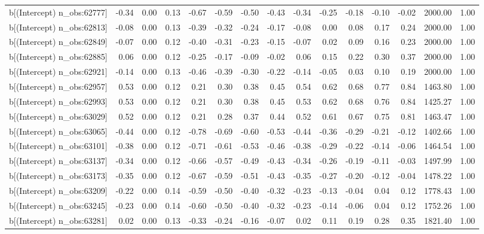 \begin{table}[ht]
\begin{tabular}{rrrrrrrrrrrrrrr}
  b[(Intercept) n\_obs:62777] & -0.34 & 0.00 & 0.13 & -0.67 & -0.59 & -0.50 & -0.43 & -0.34 & -0.25 & -0.18 & -0.10 & -0.02 & 2000.00 & 1.00 \\ 
  b[(Intercept) n\_obs:62813] & -0.08 & 0.00 & 0.13 & -0.39 & -0.32 & -0.24 & -0.17 & -0.08 & 0.00 & 0.08 & 0.17 & 0.24 & 2000.00 & 1.00 \\ 
  b[(Intercept) n\_obs:62849] & -0.07 & 0.00 & 0.12 & -0.40 & -0.31 & -0.23 & -0.15 & -0.07 & 0.02 & 0.09 & 0.16 & 0.23 & 2000.00 & 1.00 \\ 
  b[(Intercept) n\_obs:62885] & 0.06 & 0.00 & 0.12 & -0.25 & -0.17 & -0.09 & -0.02 & 0.06 & 0.15 & 0.22 & 0.30 & 0.37 & 2000.00 & 1.00 \\ 
  b[(Intercept) n\_obs:62921] & -0.14 & 0.00 & 0.13 & -0.46 & -0.39 & -0.30 & -0.22 & -0.14 & -0.05 & 0.03 & 0.10 & 0.19 & 2000.00 & 1.00 \\ 
  b[(Intercept) n\_obs:62957] & 0.53 & 0.00 & 0.12 & 0.21 & 0.30 & 0.38 & 0.45 & 0.54 & 0.62 & 0.68 & 0.77 & 0.84 & 1463.80 & 1.00 \\ 
  b[(Intercept) n\_obs:62993] & 0.53 & 0.00 & 0.12 & 0.21 & 0.30 & 0.38 & 0.45 & 0.53 & 0.62 & 0.68 & 0.76 & 0.84 & 1425.27 & 1.00 \\ 
  b[(Intercept) n\_obs:63029] & 0.52 & 0.00 & 0.12 & 0.21 & 0.28 & 0.37 & 0.44 & 0.52 & 0.61 & 0.67 & 0.75 & 0.81 & 1463.47 & 1.00 \\ 
  b[(Intercept) n\_obs:63065] & -0.44 & 0.00 & 0.12 & -0.78 & -0.69 & -0.60 & -0.53 & -0.44 & -0.36 & -0.29 & -0.21 & -0.12 & 1402.66 & 1.00 \\ 
  b[(Intercept) n\_obs:63101] & -0.38 & 0.00 & 0.12 & -0.71 & -0.61 & -0.53 & -0.46 & -0.38 & -0.29 & -0.22 & -0.14 & -0.06 & 1464.54 & 1.00 \\ 
  b[(Intercept) n\_obs:63137] & -0.34 & 0.00 & 0.12 & -0.66 & -0.57 & -0.49 & -0.43 & -0.34 & -0.26 & -0.19 & -0.11 & -0.03 & 1497.99 & 1.00 \\ 
  b[(Intercept) n\_obs:63173] & -0.35 & 0.00 & 0.12 & -0.67 & -0.59 & -0.51 & -0.43 & -0.35 & -0.27 & -0.20 & -0.12 & -0.04 & 1478.22 & 1.00 \\ 
  b[(Intercept) n\_obs:63209] & -0.22 & 0.00 & 0.14 & -0.59 & -0.50 & -0.40 & -0.32 & -0.23 & -0.13 & -0.04 & 0.04 & 0.12 & 1778.43 & 1.00 \\ 
  b[(Intercept) n\_obs:63245] & -0.23 & 0.00 & 0.14 & -0.60 & -0.50 & -0.40 & -0.32 & -0.23 & -0.14 & -0.06 & 0.04 & 0.12 & 1752.26 & 1.00 \\ 
  b[(Intercept) n\_obs:63281] & 0.02 & 0.00 & 0.13 & -0.33 & -0.24 & -0.16 & -0.07 & 0.02 & 0.11 & 0.19 & 0.28 & 0.35 & 1821.40 & 1.00 \\ 

\end{tabular}
\end{table}
